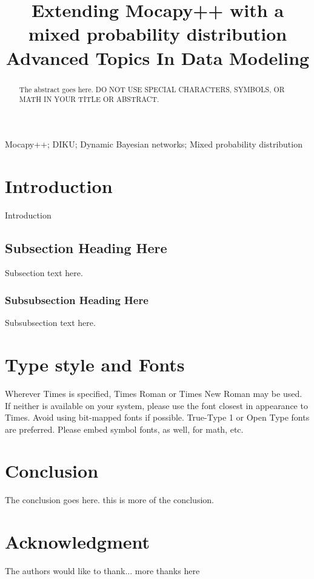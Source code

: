 \documentclass[10pt, conference, compsocconf,a4paper]{IEEEtran}
\begin{document}
\title{Extending Mocapy++ with a mixed probability distribution\\Advanced Topics In Data Modeling}


\author{
}

\maketitle


\begin{abstract}
The abstract goes here. DO NOT USE SPECIAL CHARACTERS, SYMBOLS, OR MATH IN YOUR TITLE OR ABSTRACT.

\end{abstract}

\begin{IEEEkeywords}
Mocapy++; DIKU; Dynamic Bayesian networks; Mixed probability distribution

\end{IEEEkeywords}


\section{Introduction}
Introduction

\subsection{Subsection Heading Here}
Subsection text here.

\subsubsection{Subsubsection Heading Here}
Subsubsection text here.

\section{Type style and Fonts}
Wherever Times is specified, Times Roman or Times New Roman may be used. If neither is available on your system, please use the font closest in appearance to Times. Avoid using bit-mapped fonts if possible. True-Type 1 or Open Type fonts are preferred. Please embed symbol fonts, as well, for math, etc.

\section{Conclusion}
The conclusion goes here. this is more of the conclusion.


\section*{Acknowledgment}

The authors would like to thank...
more thanks here




\end{document}
